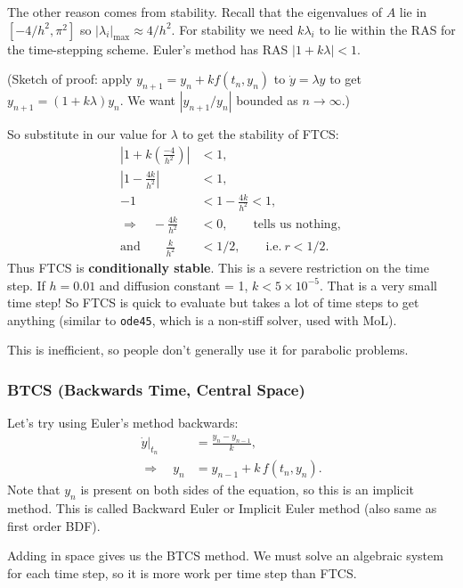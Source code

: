 \documentclass[12pt, a4paper]{article}
\theoremstyle{definition}
\theoremstyle{remark}
\numberwithin{equation}{section}
\begin{document}
The other reason comes from stability. Recall that the eigenvalues of $A$ lie in $[-4/h^2, \pi^2]$
so $|\lambda_i|_{\mathrm{max}} \approx 4/h^2$. For stability we need $k\lambda_i$ to
lie within the RAS for the time-stepping scheme. Euler's method has RAS
$|1 + k\lambda| < 1$.

(Sketch of proof: apply $y_{n+1} = y_n + k f(t_n, y_n)$ to $\dot{y}=\lambda y$ to
get \mbox{$y_{n+1} = (1+k\lambda) y_n$}. We want $|y_{n+1}/y_n|$ bounded as $n \rightarrow \infty$.)

So substitute in our value for $\lambda$ to get the stability of FTCS:
\begin{align*}
\left|1 + k\left(\tfrac{-4}{h^2}\right)\right| &< 1 ,\\
 \left| 1 - \tfrac{4k}{h^2} \right| &< 1, \\
 -1 &< 1-\tfrac{4k}{h^2} < 1, \\
\Longrightarrow \quad -\tfrac{4k}{h^2} &< 0, \qquad \text{tells us nothing}, \\
\text{and} \qquad \tfrac{k}{h^2} &< 1/2, \qquad \text{i.e.}\ r < 1/2.
\end{align*}
Thus FTCS is \textbf{conditionally stable}. This is a severe restriction on the
time step. If $h = 0.01$ and diffusion constant = 1, $k < 5\times10^{-5}$. That
is a very small time step! So FTCS is quick to evaluate but takes a lot of time
steps to get anything (similar to \verb|ode45|, which is a non-stiff solver,
used with MoL).

This is inefficient, so people don't generally use it for parabolic problems.

\newpage
\subsubsection{BTCS (Backwards Time, Central Space)}

Let's try using Euler's method backwards:
\begin{align*}
\left. \dot{y} \right|_{t_n} &= \frac{y_n - y_{n-1}}{k}, \\
\Longrightarrow \quad y_n &= y_{n-1} + k\,f(t_n, y_n).
\end{align*}
Note that $y_n$ is present on both sides of the equation, so this is
an implicit method. This is called Backward Euler or Implicit Euler method
(also same as first order BDF).

Adding in space gives us the BTCS method. We must solve an algebraic system
for each time step, so it is more work per time step than FTCS.
\end{document}
